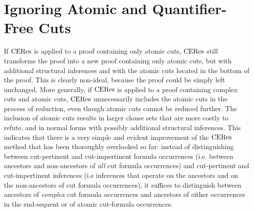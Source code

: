 \section{Ignoring Atomic and Quantifier-Free Cuts}
\label{sec:CutEliminationByResolution:CEResIgnoringAtomicCuts}

If $\mathrm{CERes}$ is applied to a proof containing only atomic cuts, $\mathrm{CERes}$ still transforms the proof into a new proof containing only atomic cuts, but with additional structural inferences and with the atomic cuts located in the bottom of the proof. This is clearly non-ideal, because the proof could be simply left unchanged. More generally, if $\mathrm{CERes}$ is applied to a proof containing complex cuts and atomic cuts, $\mathrm{CERes}$ unnecessarily includes the atomic cuts in the process of reduction, even though atomic cuts cannot be reduced further. The inclusion of atomic cuts results in larger clause sets that are more costly to refute, and in normal forms with possibly additional structural inferences. This indicates that there is a very simple and evident improvement of the $\mathrm{CERes}$ method that has been thoroughly overlooked so far: instead of distinguishing between cut-pertinent and cut-impertinent formula occurrences (i.e. between ancestors and non-ancestors of \emph{all} cut formula occurrences) and cut-pertinent and cut-impertinent inferences (i.e inferences that operate on the ancestors and on the non-ancestors of cut formula occurrences), it suffices to distinguish between ancestors of \emph{complex} cut formula occurrences and ancestors of either occurrences in the end-sequent or of atomic cut-formula occurrences.


